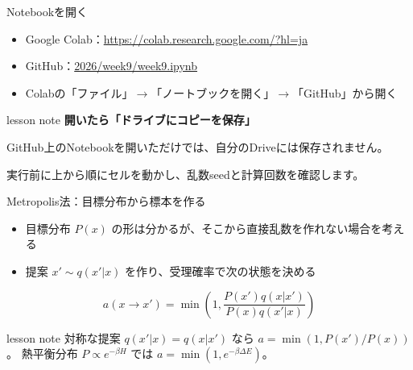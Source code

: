 \documentclass[12pt,aspectratio=43]{beamer}
\newenvironment{lessonbox}
  {\begin{beamercolorbox}[wd=\linewidth,sep=1.5mm]{lesson note}}
  {\end{beamercolorbox}\par}
\begin{document}
\begin{frame}[t]{Notebookを開く}
  \begin{itemize}
    \setlength{\itemsep}{2.5mm}
    \item Google Colab：\small\url{https://colab.research.google.com/?hl=ja}
    \item GitHub：\small\href{https://github.com/nogaki/Computational_Physics_B/tree/main/2026/week9/week9.ipynb}{2026/week9/week9.ipynb}
    \item Colabの「ファイル」\(\to\)「ノートブックを開く」\(\to\)「GitHub」から開く
  \end{itemize}
  \vspace{2mm}
  \begin{lessonbox}
    \textbf{開いたら「ドライブにコピーを保存」}\par
    \small GitHub上のNotebookを開いただけでは、自分のDriveには保存されません。
  \end{lessonbox}
  \vspace{2mm}
  \small 実行前に上から順にセルを動かし、乱数seedと計算回数を確認します。
\end{frame}

\begin{frame}[t]{Metropolis法：目標分布から標本を作る}
  \begin{itemize}
    \setlength{\itemsep}{2mm}
    \item 目標分布 $P(x)$ の形は分かるが、そこから直接乱数を作れない場合を考える
    \item 提案 $x'\sim q(x'|x)$ を作り、受理確率で次の状態を決める
  \end{itemize}
  \[
    a(x\to x')=\min\!\left(1,
      \frac{P(x')q(x|x')}{P(x)q(x'|x)}\right)
  \]
  \begin{lessonbox}
    対称な提案 $q(x'|x)=q(x|x')$ なら
    $a=\min(1,P(x')/P(x))$。
    熱平衡分布 $P\propto e^{-\beta H}$ では
    $a=\min(1,e^{-\beta\Delta E})$。
  \end{lessonbox}
\end{frame}
\end{document}
